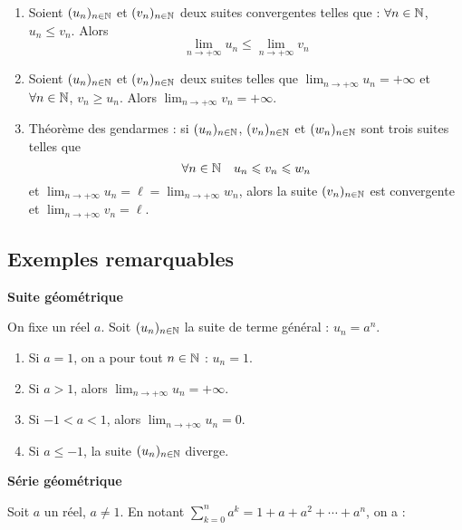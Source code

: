 \documentclass[10pt,class=article,crop=false]{standalone}
\begin{document}
\begin{multicols}{2}
\begin{proposition}
	\label{prop:lim_ineg}
	\sauteligne
	\begin{enumerate}
		\item Soient $(u_n)_{n\in \mathbb{N}}$ et $(v_n)_{n\in \mathbb{N}}$ deux suites convergentes
		telles que : $\forall n \in \mathbb{N}$, $u_n\leq v_n$. Alors
		\[\lim_{n\to +\infty} u_n \leq \lim_{n\to +\infty} v_n\]
		\item  Soient $(u_n)_{n\in \mathbb{N}}$ et $(v_n)_{n\in \mathbb{N}}$ deux suites telles que
		$\lim_{n\to +\infty} u_n=+\infty$ et  $\forall n \in \mathbb{N}$, $v_n \geq u_n$.
		Alors $\lim_{n\to +\infty} v_n=+\infty$.
		\item Théorème des  \og gendarmes \fg{} : si $(u_n)_{n\in \mathbb{N}}$,
		$(v_n)_{n\in \mathbb{N}}$ et $(w_n)_{n\in \mathbb{N}}$ sont trois suites telles que
		\[ \forall n \in \mathbb{N} \quad u_n\leqslant v_n\leqslant w_n \]
		et $\lim_{n\to +\infty}u_n=\ell=\lim_{n\to +\infty}w_n$, alors la suite $(v_n)_{n\in \mathbb{N}}$
		est convergente et $\lim_{n\to +\infty} v_n=\ell$.
	\end{enumerate}
\end{proposition}

\subsection{Exemples remarquables}

\textbf{Suite géométrique}

\begin{proposition}
	On fixe un réel $a$. Soit $(u_n)_{n\in \mathbb{N}}$ la suite de terme général : $u_n=a^n$.
	\begin{enumerate}
		\item Si $a=1$, on a pour tout $n\in \mathbb{N}$ : $u_n=1$.
		\item Si $a>1$, alors $\lim_{n\to +\infty} u_n= +\infty$.
		\item Si $-1<a<1$, alors $\lim_{n\to +\infty} u_n= 0$.
		\item Si $a\le-1$, la suite $(u_n)_{n\in \mathbb{N}}$ diverge.
	\end{enumerate}
\end{proposition}


\textbf{Série géométrique}

\begin{proposition}
	Soit $a$ un réel, $a\neq 1$. En notant $\sum_{k=0}^na^k=1+a+a^2+\cdots+a^n$, on a :
	

\end{proposition}
\end{multicols}
\end{document}
